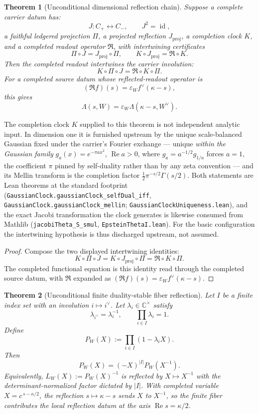 \documentclass[11pt]{article}
\newtheorem{theorem}{Theorem}
\theoremstyle{definition}
\renewcommand{\Re}{\operatorname{Re}}
\begin{document}
\begin{theorem}[Unconditional dimensional reflection chain]\label{thm:g8-dimensional-reflection-chain}
Suppose a complete carrier datum has:
\[
J:C_+\leftrightarrow C_-,\qquad J^2=\operatorname{id},
\]
a faithful ledgered projection \(\Pi\), a projected reflection
\(J_{\mathrm{proj}}\), a completion clock \(K\), and a completed readout
operator \(\mathfrak R\), with intertwining certificates
\[
\Pi\circ J=J_{\mathrm{proj}}\circ\Pi,
\qquad
K\circ J_{\mathrm{proj}}=\mathfrak R\circ K.
\]
Then the completed readout intertwines the carrier involution:
\[
K\circ\Pi\circ J=\mathfrak R\circ K\circ\Pi.
\]
For a completed source datum whose reflected-readout operator is
\[
(\mathfrak R f)(s)=\varepsilon_W f^\vee(\kappa-s),
\]
this gives
\[
\Lambda(s,W)=\varepsilon_W\Lambda(\kappa-s,W^\vee).
\]
\end{theorem}

\noindent The completion clock \(K\) supplied to this theorem is not
independent analytic input.  In dimension one it is furnished upstream by
the unique scale-balanced Gaussian fixed under the carrier's Fourier
exchange --- unique \emph{within the Gaussian family}
\(g_a(x)=e^{-\pi a x^2}\), \(\Re a>0\), where
\(\widehat{g_a}=a^{-1/2}g_{1/a}\) forces \(a=1\), the coefficient \(\pi\)
pinned by self-duality rather than by any zeta convention --- and its
Mellin transform is the completion factor
\(\tfrac12\pi^{-s/2}\Gamma(s/2)\).  Both statements are Lean theorems at
the standard footprint
(\texttt{GaussianClock.gaussianClock\_selfDual\_iff},
\texttt{GaussianClock.gaussianClock\_mellin};
\texttt{GaussianClockUniqueness.lean}), and the exact Jacobi
transformation the clock generates is likewise consumed from Mathlib
(\texttt{jacobiTheta\_S\_smul}, \texttt{EpsteinThetaI.lean}).  For the
basic configuration the intertwining hypothesis is thus discharged
upstream, not assumed.

\begin{proof}
Compose the two displayed intertwining identities:
\[
K\circ\Pi\circ J
=K\circ J_{\mathrm{proj}}\circ\Pi
=\mathfrak R\circ K\circ\Pi.
\]
The completed functional equation is this identity read through the completed
source datum, with \(\mathfrak R\) expanded as
\((\mathfrak R f)(s)=\varepsilon_W f^\vee(\kappa-s)\).
\end{proof}

\begin{theorem}[Unconditional finite duality-stable fiber reflection]\label{thm:g8-finite-fiber-reflection}
Let \(I\) be a finite index set with an involution \(i\mapsto i^\vee\).
Let \(\lambda_i\in\mathbb C^\times\) satisfy
\[
\lambda_{i^\vee}=\lambda_i^{-1},
\qquad
\prod_{i\in I}\lambda_i=1.
\]
Define
\[
P_W(X):=\prod_{i\in I}(1-\lambda_iX).
\]
Then
\[
P_W(X)=(-X)^{|I|}P_W(X^{-1}).
\]
Equivalently, \(L_W(X):=P_W(X)^{-1}\) is reflected by
\(X\mapsto X^{-1}\) with the determinant-normalized factor dictated by
\(|I|\).  With completed variable \(X=c^{\,s-\kappa/2}\), the reflection
\(s\mapsto\kappa-s\) sends \(X\) to \(X^{-1}\), so the finite fiber
contributes the local reflection datum at the axis \(\Re s=\kappa/2\).
\end{theorem}
\end{document}
